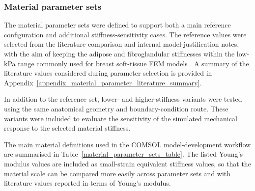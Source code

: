 \subsubsection{Material parameter sets}
\label{material_parameter_sets}

The material parameter sets were defined to support both a main reference configuration and additional stiffness-sensitivity cases. The reference values were selected from the literature comparison and internal model-justification notes, with the aim of keeping the adipose and fibroglandular stiffnesses within the low-kPa range commonly used for breast soft-tissue FEM models \cite{Samani2007,Ramiao2016,Goodbrake2022,Teixeira2023}. A summary of the literature values considered during parameter selection is provided in Appendix~\ref{appendix_material_parameter_literature_summary}.

In addition to the reference set, lower- and higher-stiffness variants were tested using the same anatomical geometry and boundary-condition route. These variants were included to evaluate the sensitivity of the simulated mechanical response to the selected material stiffness.

The main material definitions used in the COMSOL model-development workflow are summarised in Table~\ref{material_parameter_sets_table}. The listed Young's modulus values are included as small-strain equivalent stiffness values, so that the material scale can be compared more easily across parameter sets and with literature values reported in terms of Young's modulus.

